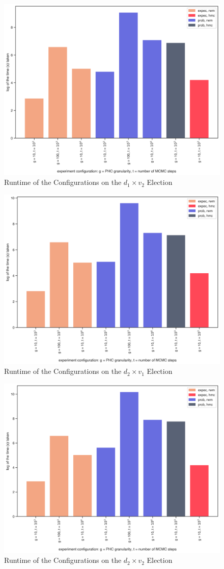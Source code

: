 \begin{figure}[ht]\centering
 \includegraphics[width=0.75\linewidth]{figures/1_2_time.png}
 \caption{Runtime of the Configurations on the $d_1 \times v_2$ Election}
 \label{fig:1_2_time}
\end{figure}

\begin{figure}[ht]\centering
 \includegraphics[width=0.75\linewidth]{figures/2_1_time.png}
 \caption{Runtime of the Configurations on the $d_2 \times v_1$ Election}
 \label{fig:2_1_time}
\end{figure}

\begin{figure}[ht]\centering
 \includegraphics[width=0.75\linewidth]{figures/1_1_time.png}
 \caption{Runtime of the Configurations on the $d_2 \times v_2$ Election}
 \label{fig:2_2_time}
\end{figure}


